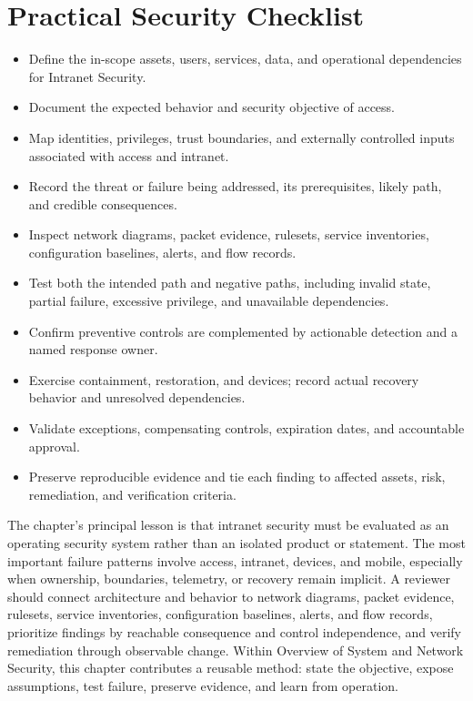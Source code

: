 \documentclass[11pt]{article}
\begin{document}
\section*{Practical Security Checklist}
\begin{itemize}[label=$\square$]
\item Define the in-scope assets, users, services, data, and operational dependencies for Intranet Security.
\item Document the expected behavior and security objective of access.
\item Map identities, privileges, trust boundaries, and externally controlled inputs associated with access and intranet.
\item Record the threat or failure being addressed, its prerequisites, likely path, and credible consequences.
\item Inspect network diagrams, packet evidence, rulesets, service inventories, configuration baselines, alerts, and flow records.
\item Test both the intended path and negative paths, including invalid state, partial failure, excessive privilege, and unavailable dependencies.
\item Confirm preventive controls are complemented by actionable detection and a named response owner.
\item Exercise containment, restoration, and devices; record actual recovery behavior and unresolved dependencies.
\item Validate exceptions, compensating controls, expiration dates, and accountable approval.
\item Preserve reproducible evidence and tie each finding to affected assets, risk, remediation, and verification criteria.
\end{itemize}
\begin{synthesisbox}
The chapter's principal lesson is that intranet security must be evaluated as an operating security system rather than an isolated product or statement. The most important failure patterns involve access, intranet, devices, and mobile, especially when ownership, boundaries, telemetry, or recovery remain implicit. A reviewer should connect architecture and behavior to network diagrams, packet evidence, rulesets, service inventories, configuration baselines, alerts, and flow records, prioritize findings by reachable consequence and control independence, and verify remediation through observable change. Within Overview of System and Network Security, this chapter contributes a reusable method: state the objective, expose assumptions, test failure, preserve evidence, and learn from operation.
\end{synthesisbox}
\end{document}
